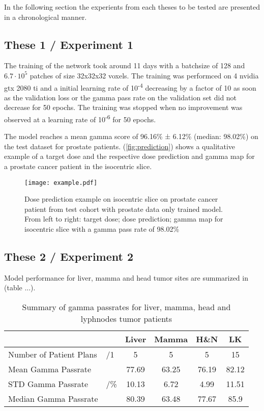 In the following section the experients from each theses to be tested are presented in a chronological manner.

\subsection{These 1 / Experiment 1}

The training of the network took around 11 days with a batchsize of 128 and $6.7\cdot10^5$ patches of size 32x32x32 voxels. The training was performced on 4 nvidia gtx 2080 ti and a initial learning rate of 10\textsuperscript{-4} decreasing by a factor of 10 as soon as the validation loss or the gamma pass rate on the validation set did not decrease for 50 epochs. The training was stopped when no improvement was observed at a learning rate of 10\textsuperscript{-6} for 50 epochs. 

The model reaches a mean gamma score of 96.16\% ± 6.12\% (median: 98.02\%) on the test dataset for prostate patients. (\autoref{fig:prediction}) shows a qualitative example of a target dose and the respective dose prediction and gamma map for a prostate cancer patient in the isocentric slice. 

\begin{figure}[h]
    \centering
    \texttt{[image: example.pdf]}
    \caption{Dose prediction example on isocentric slice on prostate cancer patient from test cohort with prostate data only trained model. From left to right: target dose; dose prediction; gamma map for isocentric slice with a gamma pass rate of 98.02\%}
    \label{fig:prediction}
\end{figure}

\subsection{These 2 / Experiment 2}

Model performance for liver, mamma and head tumor sites are summarized in (table ...). 

\begin{table}[]
    \centering
    \begin{tabular}{|ll|cccc|}
    \hline
                            &                      & \textbf{Liver} & \textbf{Mamma} & \textbf{H\&N} & \textbf{LK} \\ \hline
    Number of Patient Plans & /1                   & 5              & 5              & 5             & 15          \\ \cline{1-2}
    Mean Gamma Passrate     & \multirow{3}{*}{/\%} & 77.69          & 63.25          & 76.19         & 82.12       \\
    STD Gamma Passrate      &                      & 10.13          & 6.72           & 4.99          & 11.51       \\
    Median Gamma Passrate   &                      & 80.39          & 63.48          & 77.67         & 85.9        \\ \hline
    \end{tabular}
    \caption{Summary of gamma passrates for liver, mamma, head and lyphnodes tumor patients}
    \label{tab:prost}
\end{table}


